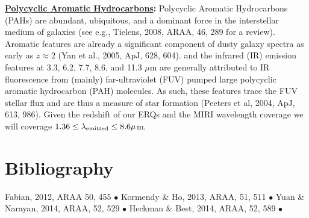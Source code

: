 \medskip
\medskip
\smallskip
\smallskip
\noindent
{\bf \underline{Polycyclic Aromatic Hydrocarbons}:}
Polycyclic Aromatic Hydrocarbons (PAHs) are abundant, ubiquitous, and
a dominant force in the interstellar medium of galaxies (see e.g.,
Tielens, 2008, ARAA, 46, 289 for a review).  Aromatic features are
already a significant component of dusty galaxy spectra as early as
$z\approx2$ (Yan et al., 2005, ApJ, 628, 604).  and the infrared (IR)
emission features at 3.3, 6.2, 7.7, 8.6, and 11.3 $\mu$m are generally
attributed to IR fluorescence from (mainly) far-ultraviolet (FUV)
pumped large polycyclic aromatic hydrocarbon (PAH) molecules. As such,
these features trace the FUV stellar flux and are thus a measure of
star formation (Peeters et al, 2004, ApJ, 613, 986).
Given the redshift of our ERQs and the MIRI wavelength coverage we will coverage $1.36 \leq \lambda_{\rm emitted} \leq 8.6 \mu$m.




\section{Bibliography}
Fabian, 2012, ARAA 50, 455 $\bullet$ 
Kormendy \& Ho, 2013, ARAA, 51, 511 $\bullet$
Yuan \& Narayan, 2014, ARAA, 52, 529 $\bullet$
Heckman \& Best, 2014, ARAA, 52, 589  $\bullet$



\clearpage


